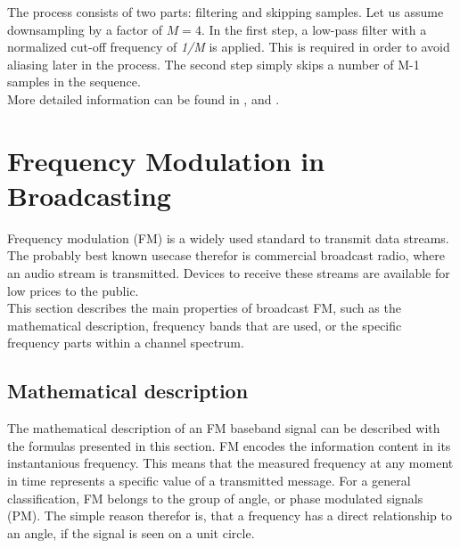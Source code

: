 The process consists of two parts: filtering and skipping samples.
Let us assume downsampling by a factor of $M=4$.
In the first step, a low-pass filter with a normalized cut-off frequency of \textit{1/M} is applied.
This is required in order to avoid aliasing later in the process.
The second step simply skips a number of M-1 samples in the sequence.\\

More detailed information can be found in \cite[chpt. 6.9]{AlessioSilviaMaria2016DSPa}, \cite[chpt. 4.1]{GopiE.S2018MDSP} and \cite[chpt. 10.2.2]{ThyagarajanK.S2019ItDS}.

\section{Frequency Modulation in Broadcasting}

Frequency modulation (FM) is a widely used standard to transmit data streams.
The probably best known usecase therefor is commercial broadcast radio, where an audio stream is transmitted.
Devices to receive these streams are available for low prices to the public.\\

This section describes the main properties of broadcast FM, such as the mathematical description, frequency bands that are used, or the specific frequency parts within a channel spectrum.

\subsection{Mathematical description}

The mathematical description of an FM baseband signal can be described with the formulas presented in this section.
FM encodes the information content in its instantanious frequency.
This means that the measured frequency at any moment in time represents a specific value of a transmitted message.
For a general classification, FM belongs to the group of angle, or phase modulated signals (PM).
The simple reason therefor is, that a frequency has a direct relationship to an angle, if the signal is seen on a unit circle.\\

